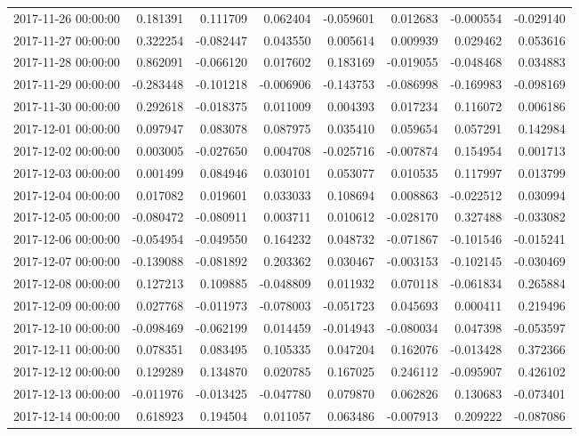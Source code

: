 \begin{tabular}{lrrrrrrr}
2017-11-26 00:00:00 & 0.181391 & 0.111709 & 0.062404 & -0.059601 & 0.012683 & -0.000554 & -0.029140 \\
2017-11-27 00:00:00 & 0.322254 & -0.082447 & 0.043550 & 0.005614 & 0.009939 & 0.029462 & 0.053616 \\
2017-11-28 00:00:00 & 0.862091 & -0.066120 & 0.017602 & 0.183169 & -0.019055 & -0.048468 & 0.034883 \\
2017-11-29 00:00:00 & -0.283448 & -0.101218 & -0.006906 & -0.143753 & -0.086998 & -0.169983 & -0.098169 \\
2017-11-30 00:00:00 & 0.292618 & -0.018375 & 0.011009 & 0.004393 & 0.017234 & 0.116072 & 0.006186 \\
2017-12-01 00:00:00 & 0.097947 & 0.083078 & 0.087975 & 0.035410 & 0.059654 & 0.057291 & 0.142984 \\
2017-12-02 00:00:00 & 0.003005 & -0.027650 & 0.004708 & -0.025716 & -0.007874 & 0.154954 & 0.001713 \\
2017-12-03 00:00:00 & 0.001499 & 0.084946 & 0.030101 & 0.053077 & 0.010535 & 0.117997 & 0.013799 \\
2017-12-04 00:00:00 & 0.017082 & 0.019601 & 0.033033 & 0.108694 & 0.008863 & -0.022512 & 0.030994 \\
2017-12-05 00:00:00 & -0.080472 & -0.080911 & 0.003711 & 0.010612 & -0.028170 & 0.327488 & -0.033082 \\
2017-12-06 00:00:00 & -0.054954 & -0.049550 & 0.164232 & 0.048732 & -0.071867 & -0.101546 & -0.015241 \\
2017-12-07 00:00:00 & -0.139088 & -0.081892 & 0.203362 & 0.030467 & -0.003153 & -0.102145 & -0.030469 \\
2017-12-08 00:00:00 & 0.127213 & 0.109885 & -0.048809 & 0.011932 & 0.070118 & -0.061834 & 0.265884 \\
2017-12-09 00:00:00 & 0.027768 & -0.011973 & -0.078003 & -0.051723 & 0.045693 & 0.000411 & 0.219496 \\
2017-12-10 00:00:00 & -0.098469 & -0.062199 & 0.014459 & -0.014943 & -0.080034 & 0.047398 & -0.053597 \\
2017-12-11 00:00:00 & 0.078351 & 0.083495 & 0.105335 & 0.047204 & 0.162076 & -0.013428 & 0.372366 \\
2017-12-12 00:00:00 & 0.129289 & 0.134870 & 0.020785 & 0.167025 & 0.246112 & -0.095907 & 0.426102 \\
2017-12-13 00:00:00 & -0.011976 & -0.013425 & -0.047780 & 0.079870 & 0.062826 & 0.130683 & -0.073401 \\
2017-12-14 00:00:00 & 0.618923 & 0.194504 & 0.011057 & 0.063486 & -0.007913 & 0.209222 & -0.087086 \\

\end{tabular}
